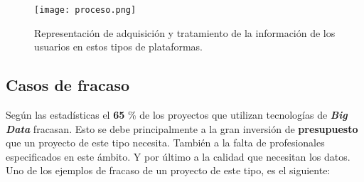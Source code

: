 \documentclass[11pt]{diazessay} %
\begin{document}
\begin{figure}[h!]
	\centering
	\texttt{[image: proceso.png]}
	\caption{Representación de adquisición y tratamiento de la información de los usuarios en estos tipos de plataformas.}
	\label{fig:proceso}
\end{figure}


\subsection*{Casos de fracaso}
Según las estadísticas el \textbf{65} \% de los proyectos que utilizan tecnologías de \textit{\textbf{Big Data}} fracasan. Esto se debe principalmente a la gran inversión de \textbf{presupuesto} que un proyecto de este tipo necesita. También a la falta de profesionales especificados en este ámbito. Y por último a la calidad que necesitan los datos. Uno de los ejemplos de fracaso de un proyecto de este tipo, es el siguiente:\\
 










\clearpage




\end{document}
